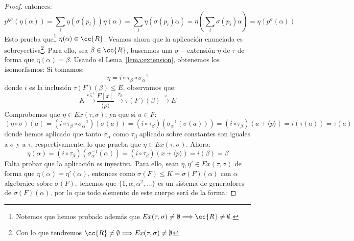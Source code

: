 \begin{prop}
\begin{proof}
        entonces:
        \begin{equation*}
            p^{\eta\sigma}(\eta(\alpha)) = \sum_i \eta(\sigma(p_i)) \eta(\alpha) = \sum_i \eta(\sigma(p_i)\alpha) = \eta\left(\sum_i \sigma(p_i) \alpha\right) = \eta(p^\sigma(\alpha))
        \end{equation*}
        Esto prueba que\footnote{Notemos que hemos probado además que $Ex(\tau,\sigma)\neq \emptyset \Longrightarrow \cc{R}\neq \emptyset $.} $\eta(\alpha)\in \cc{R}$. Veamos ahora que la aplicación enunciada es sobreyectiva\footnote{Con lo que tendremos $\cc{R}\neq \emptyset \Longrightarrow Ex(\tau,\sigma)\neq \emptyset $}. Para ello, sea $\beta\in \cc{R}$, buscamos una $\sigma-$extensión $\eta$ de $\tau$ de forma que $\eta(\alpha) = \beta$. Usando el Lema~\ref{lema:extension}, obtenemos los isomorfismos:
        Si tomamos:
        \begin{equation*}
            \eta = i \circ \tau_\beta \circ \sigma_\alpha^{-1}
        \end{equation*}
        donde $i$ es la inclusión $\tau(F)(\beta)\leq E$, observamos que:
        \begin{equation*}
            K\stackrel{\sigma_\alpha^{-1}}{\longrightarrow} \frac{F[x]}{\langle p \rangle } \stackrel{\tau_\beta}{\longrightarrow} \tau(F)(\beta) \stackrel{i}{\longrightarrow} E
        \end{equation*}
        Comprobemos que $\eta\in Ex(\tau,\sigma)$, ya que si $a\in F$:
        \begin{equation*}
            (\eta \circ \sigma)(a) = (i\circ \tau_\beta\circ \sigma_\alpha^{-1})(\sigma(a)) = (i\circ \tau_\beta)(\sigma_\alpha^{-1}(\sigma(a))) = (i\circ \tau_\beta)(a+\langle p \rangle ) = i(\tau(a)) = \tau(a)
        \end{equation*}
        donde hemos aplicado que tanto $\sigma_\alpha$ como $\tau_\beta$ aplicado sobre constantes son iguales a $\sigma$ y a $\tau$, respectivamente, lo que prueba que $\eta\in Ex(\tau,\sigma)$. Ahora:
        \begin{equation*}
            \eta(\alpha) = (i\circ \tau_\beta)(\sigma_\alpha^{-1}(\alpha))= (i\circ \tau_\beta)(x+\langle p \rangle ) = i(\beta) = \beta
        \end{equation*}
        Falta probar que la aplicación es inyectiva. Para ello, sean $\eta,\eta' \in Ex(\tau,\sigma)$ de forma que $\eta(\alpha)=\eta'(\alpha)$, entonces como $\sigma(F)\leq K=\sigma(F)(\alpha)$ con $\alpha$ algebraico sobre $\sigma(F)$, tenemos que $\{1,\alpha,\alpha^2, \ldots\}$ es un sistema de generadores de $\sigma(F)(\alpha)$, por lo que todo elemento de este cuerpo será de la forma:

\end{proof}
\end{prop}

